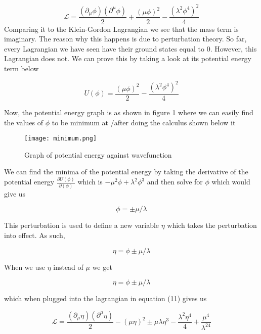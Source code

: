 \documentclass[12pt]{article}
\begin{document}
\begin{equation}
\mathcal{L}=\frac{(\partial_\mu\phi)(\partial^\mu\phi)}{2}+\frac{(\mu\phi)^2}{2}-\frac{(\lambda^2\phi^4)^2}{4}
\end{equation}
Comparing it to the Klein-Gordon Lagrangian we see that the mass term is imaginary. The reason why this happens is due to perturbation theory. So far, every Lagrangian we have seen have their ground states equal to 0. However, this Lagrangian does not. We can prove this by taking a look at its potential energy term below

\begin{equation}
U(\phi)=\frac{(\mu\phi)^2}{2}-\frac{(\lambda^2\phi^4)^2}{4}
\end{equation}

Now, the potential energy graph is as shown in figure 1 where we can easily find the values of $\phi$ to be minimum at /after doing the calculus shown below it

\begin{figure}[H]
	\begin{center}
		\texttt{[image: minimum.png]}
	\end{center}
	\caption{Graph of potential energy against wavefunction}
	\label{fig:figure1}
	\cite{ts}
\end{figure}

We can find the minima of the potential energy by taking the derivative of the potential energy $\frac{\partial{U(\phi)}}{\partial(\phi)}$ which is $-\mu^2\phi+\lambda^2\phi^3$ and then solve for $\phi$ which would give us 


\begin{equation}
	\phi=\pm\mu/\lambda
\end{equation}

This perturbation is used to define a new variable $\eta$ which takes the perturbation into effect. As such,

\begin{equation}
\eta=\phi\pm\mu/\lambda
\end{equation}

When we use $\eta$ instead of $\mu$ we get 

\begin{equation}
\eta=\phi\pm\mu/\lambda
\end{equation}

which when plugged into the lagrangian in equation (11) gives us

\begin{equation}
\mathcal{L}=\frac{(\partial_\mu\eta)(\partial^\mu\eta)}{2}-(\mu\eta)^2\pm\mu\lambda\eta^3-\frac{\lambda^2\eta^4}{4}+\frac{\mu^4}{\lambda^24}
\end{equation}
\end{document}
